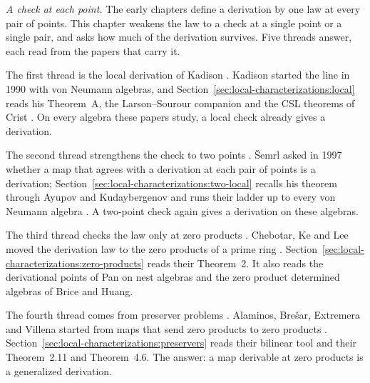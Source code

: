 \emph{A check at each point.} The early chapters define a derivation by
one law at every pair of points. This chapter weakens the law to a check
at a single point or a single pair, and asks how much of the derivation
survives. Five threads answer, each read from the papers that carry it.


The first thread is the local derivation of Kadison
\cite[p.~494]{Kadison1990Local}. Kadison started the line in 1990 with
von Neumann algebras, and Section~\ref{sec:local-characterizations:local}
reads his Theorem~A, the Larson--Sourour companion and the CSL theorems of
Crist \cite[p.~83]{Crist1996Local}. On every algebra these papers study,
a local check already gives a derivation.

The second thread strengthens the check to two points
\cite[p.~15]{AyupovKudaybergenov2012}. \v{S}emrl asked in 1997 whether a
map that agrees with a derivation at each pair of points is a derivation;
Section~\ref{sec:local-characterizations:two-local} recalls his theorem
through Ayupov and Kudaybergenov and runs their ladder up to every von
Neumann algebra \cite[p.~2]{AyupovKudaybergenov2015}. A two-point check
again gives a derivation on these algebras.

The third thread checks the law only at zero products
\cite[p.~218]{ChebotarKeLee2004}. Chebotar, Ke and Lee moved the
derivation law to the zero products of a prime ring
\cite[p.~218]{ChebotarKeLee2004}.
Section~\ref{sec:local-characterizations:zero-products} reads their
Theorem~2. It also reads the derivational points of Pan on nest algebras and
the zero product determined algebras of Brice and Huang.

The fourth thread comes from preserver problems
\cite[p.~131]{AlaminosBresar2009}. Alaminos, Bre\v{s}ar, Extremera and
Villena started from maps that send zero products to zero products
\cite[p.~131]{AlaminosBresar2009}.
Section~\ref{sec:local-characterizations:preservers} reads their bilinear
tool and their Theorem~2.11 and Theorem~4.6. The answer: a map derivable
at zero products is a generalized derivation.

